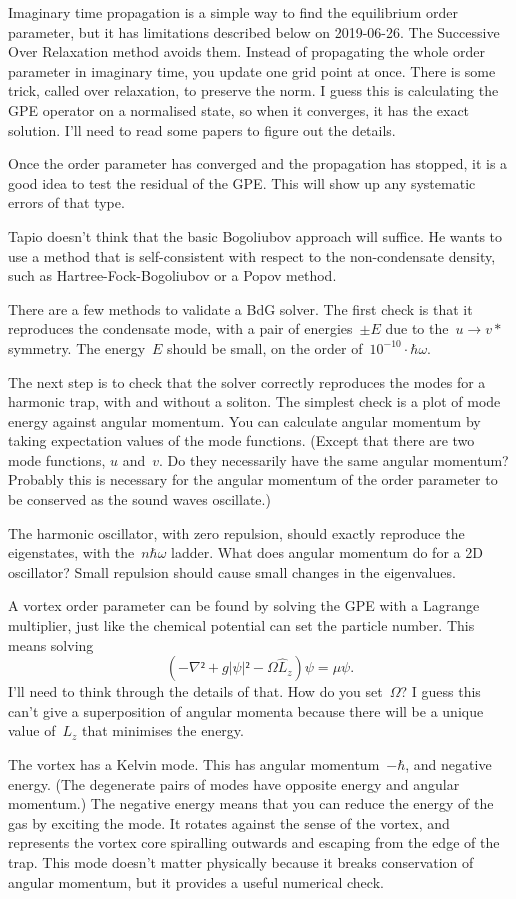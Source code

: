 Imaginary time propagation is a simple way to find the equilibrium
order parameter, but it has limitations described below on 2019-06-26.  The Successive Over Relaxation method avoids them.  Instead of
propagating the whole order parameter in imaginary time, you update
one grid point at once.  There is some trick, called over relaxation,
to preserve the norm.  I guess this is calculating the GPE operator
on a normalised state, so when it converges, it has the exact
solution.  I'll need to read some papers to figure out the details.

Once the order parameter has converged and the propagation has
stopped, it is a good idea to test the residual of the GPE.  This
will show up any systematic errors of that type.

Tapio doesn't think that the basic Bogoliubov approach will suffice.
He wants to use a method that is self-consistent with respect to
the non-condensate density, such as Hartree-Fock-Bogoliubov or a
Popov method.

There are a few methods to validate a BdG solver.  The first check
is that it reproduces the condensate mode, with a pair of energies~$±E$
due to the~$u→v*$ symmetry.  The energy~$E$ should be small, on the
order of~$10^{-10}·ℏω$.

The next step is to check that the solver correctly reproduces the
modes for a harmonic trap, with and without a soliton.  The simplest
check is a plot of mode energy against angular momentum.  You can
calculate angular momentum by taking expectation values of the mode
functions.  (Except that there are two mode functions, $u$ and~$v$.
Do they necessarily have the same angular momentum?  Probably this
is necessary for the angular momentum of the order parameter to be
conserved as the sound waves oscillate.)

The harmonic oscillator, with zero repulsion, should exactly reproduce
the eigenstates, with the~$nℏω$ ladder.  What does angular momentum
do for a 2D oscillator?  Small repulsion should cause small changes
in the eigenvalues.

A vortex order parameter can be found by solving the GPE with a
Lagrange multiplier, just like the chemical potential can set the
particle number.  This means solving
$$(-∇²+g|ψ|²-Ω\hat L_z)ψ=μψ.$$
I'll need to think through the details of that.  How do you set~$Ω$?
I guess this can't give a superposition of angular momenta because
there will be a unique value of~$L_z$ that minimises the energy.

The vortex has a Kelvin mode.  This has angular momentum~$-ℏ$, and
negative energy.  (The degenerate pairs of modes have opposite
energy and angular momentum.)  The negative energy means that you
can reduce the energy of the gas by exciting the mode.  It rotates
against the sense of the vortex, and represents the vortex core
spiralling outwards and escaping from the edge of the trap.  This
mode doesn't matter physically because it breaks conservation of
angular momentum, but it provides a useful numerical check.

